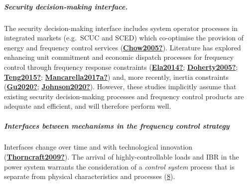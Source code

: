 \documentclass[12pt,a4paper,]{report}
\begin{document}
\hypertarget{security-decision-making-interface.}{%
\subparagraph{Security decision-making
interface.}\label{security-decision-making-interface.}}

The security decision-making interface includes system operator
processes in integrated markets (e.g.~SCUC and SCED) which co-optimise
the provision of energy and frequency control services
(\protect\hyperlink{ref-Chow2005}{\textbf{Chow2005?}}). Literature has
explored enhancing unit commitment and economic dispatch processes for
frequency control through frequency response constraints
(\protect\hyperlink{ref-Ela2014}{\textbf{Ela2014?}};
\protect\hyperlink{ref-Doherty2005}{\textbf{Doherty2005?}};
\protect\hyperlink{ref-Teng2015}{\textbf{Teng2015?}};
\protect\hyperlink{ref-Mancarella2017a}{\textbf{Mancarella2017a?}}) and,
more recently, inertia constraints
(\protect\hyperlink{ref-Gu2020}{\textbf{Gu2020?}};
\protect\hyperlink{ref-Johnson2020}{\textbf{Johnson2020?}}). However,
these studies implicitly assume that existing security decision-making
processes and frequency control products are adequate and efficient, and
will therefore perform well.

\hypertarget{interfaces-between-mechanisms-in-the-frequency-control-strategy}{%
\subparagraph{Interfaces between mechanisms in the frequency control
strategy}\label{interfaces-between-mechanisms-in-the-frequency-control-strategy}}

Interfaces change over time and with technological innovation
(\protect\hyperlink{ref-Thorncraft2009}{\textbf{Thorncraft2009?}}). The
arrival of highly-controllable loads and IBR in the power system
warrants the consideration of a \emph{control system} process that is
separate from physical characteristics and processes
(\protect\hyperlink{fig:interfaces}{8}).
\end{document}
